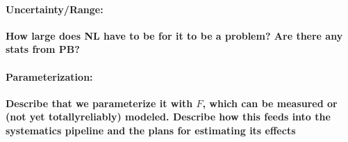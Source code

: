 \paragraph{Uncertainty/Range:}
\textbf{How large does NL have to be for it to be a problem? Are there any stats from PB?}

\paragraph{Parameterization:}
\textbf{Describe that we parameterize it with $F$, which can be measured or (not yet totallyreliably) modeled. Describe how this feeds into the systematics pipeline and the plans for estimating its effects}

